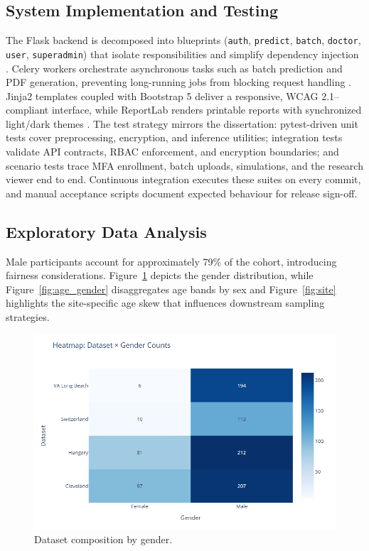 \documentclass[12pt]{article}
\begin{document}
\subsection{System Implementation and Testing}
The Flask backend is decomposed into blueprints (\texttt{auth}, \texttt{predict}, \texttt{batch}, \texttt{doctor}, \texttt{user}, \texttt{superadmin}) that isolate responsibilities and simplify dependency injection \cite{grinberg2018flask}. Celery workers orchestrate asynchronous tasks such as batch prediction and PDF generation, preventing long-running jobs from blocking request handling \cite{celery}. Jinja2 templates coupled with Bootstrap 5 deliver a responsive, WCAG 2.1–compliant interface, while ReportLab renders printable reports with synchronized light/dark themes \cite{bootstrap5, reportlab, w3c_wcag21}. The test strategy mirrors the dissertation: pytest-driven unit tests cover preprocessing, encryption, and inference utilities; integration tests validate API contracts, RBAC enforcement, and encryption boundaries; and scenario tests trace MFA enrollment, batch uploads, simulations, and the research viewer end to end. Continuous integration executes these suites on every commit, and manual acceptance scripts document expected behaviour for release sign-off.

\subsection{Exploratory Data Analysis}
Male participants account for approximately 79\% of the cohort, introducing fairness considerations. Figure~\ref{fig:gender} depicts the gender distribution, while Figure~\ref{fig:age_gender} disaggregates age bands by sex and Figure~\ref{fig:site} highlights the site-specific age skew that influences downstream sampling strategies.

\begin{figure}[t]
  \centering
  \includegraphics[width=0.85\linewidth]{dataset_composition_by_gender.png}
  \caption{Dataset composition by gender.}
  \label{fig:gender}
\end{figure}
\end{document}
